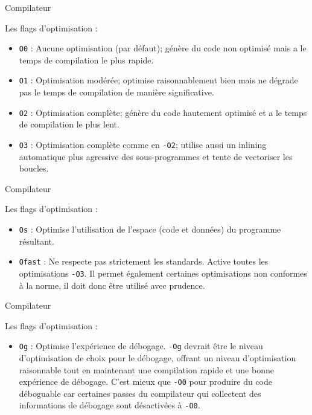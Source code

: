 \begin{frame}{Compilateur}
	\begin{block}{Les flags d'optimisation :}
		\begin{itemize}
			\item \texttt{O0} : Aucune optimisation (par défaut); génère du code non optimisé mais a le temps de compilation le plus rapide.
			\item \texttt{O1} : Optimisation modérée; optimise raisonnablement bien mais ne dégrade pas le temps de compilation de manière significative.
			\item \texttt{O2} : Optimisation complète; génère du code hautement optimisé et a le temps de compilation le plus lent.
			\item \texttt{O3} : Optimisation complète comme en \texttt{-O2}; utilise aussi un \alert{inlining} automatique plus agressive des sous-programmes et tente de vectoriser les boucles.
			
		\end{itemize}
	\end{block}
\end{frame}

\begin{frame}{Compilateur}
	\begin{block}{Les flags d'optimisation :}
		\begin{itemize}
			\item \texttt{Os} : Optimise l'utilisation de l'espace (code et données) du programme résultant.
			\item \texttt{Ofast} : Ne respecte pas strictement les standards. Active toutes les optimisations \texttt{-O3}. Il permet également certaines optimisations non conformes à la norme, il doit donc être utilisé avec prudence.
		\end{itemize}
	\end{block}
\end{frame}

\begin{frame}{Compilateur}
	\begin{block}{Les flags d'optimisation :}
		\begin{itemize}
			\item \texttt{Og} : Optimise l'expérience de débogage. \texttt{-Og} devrait être le niveau d'optimisation de choix pour le débogage, offrant un niveau d'optimisation raisonnable tout en maintenant une compilation rapide et une bonne expérience de débogage. C'est mieux que \texttt{-O0} pour produire du code déboguable car certaines passes du compilateur qui collectent des informations de débogage sont désactivées à \texttt{-O0}.
		\end{itemize}
	\end{block}
\end{frame}

